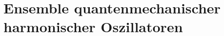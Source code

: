 \subsection{}

\section{Ensemble quantenmechanischer harmonischer Oszillatoren}
\subsection{}
\subsection{}
\subsection{}
\subsection{}
\subsection{}

